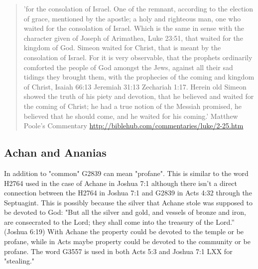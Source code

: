 \documentclass[11pt]{article}
\begin{document}
\begin{quote}
'for the consolation of Israel. One of the remnant, according to the election of grace, mentioned by the apostle; a holy and righteous man, one who waited for the consolation of Israel. Which is the same in sense with the character given of Joseph of Arimathea, Luke 23:51, that waited for the kingdom of God. Simeon waited for Christ, that is meant by the consolation of Israel. For it is very observable, that the prophets ordinarily comforted the people of God amongst the Jews, against all their sad tidings they brought them, with the prophecies of the coming and kingdom of Christ, Isaiah 66:13 Jeremiah 31:13 Zechariah 1:17. Herein old Simeon showed the truth of his piety and devotion, that he believed and waited for the coming of Christ; he had a true notion of the Messiah promised, he believed that he should come, and he waited for his coming.'\newline
Matthew Poole's Commentary
\url{http://biblehub.com/commentaries/luke/2-25.htm}
\end{quote}

\subsection{Achan and Ananias}
In addition to "common" G2839 can mean "profane".\cite{common faith} This is similar to the word H2764 used in the case of Achane in Joshua 7:1\cite{H2764 H2763} although there isn't a direct connection between the H2764 in Joshua 7:1 and G2839 in Acts 4:32 through the Septuagint.
This is possibly because the silver that Achane stole was supposed to be devoted to God: "But all the silver and gold, and vessels of bronze and iron, are consecrated to the Lord; they shall come into the treasury of the Lord.” (Joshua 6:19)
 With Achane the property could be devoted to the temple or be profane, while in Acts maybe property could be devoted to the community or be profane. The word G3557 is used in both Acts 5:3 and Joshua 7:1 LXX for "stealing." 
\end{document}

